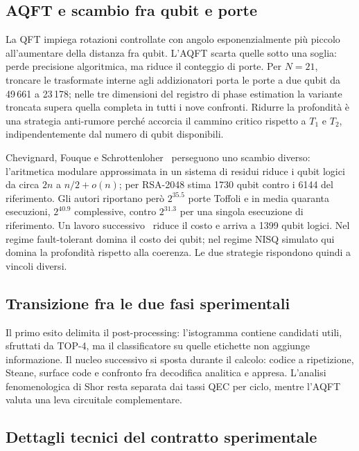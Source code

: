 \subsection{AQFT e scambio fra qubit e porte}
\label{app:aqft_estesa}

La \ac{QFT} impiega rotazioni controllate con angolo esponenzialmente più
piccolo all'aumentare della distanza fra qubit. L'\ac{AQFT} scarta quelle sotto
una soglia: perde precisione algoritmica, ma riduce il conteggio di porte. Per
$N=21$, troncare le trasformate interne agli addizionatori porta le porte a due
qubit da 49\,661 a 23\,178; nelle tre dimensioni del registro di phase
estimation la variante troncata supera quella completa in tutti i nove
confronti. Ridurre la profondità è una strategia anti-rumore perché accorcia il
cammino critico rispetto a $T_1$ e $T_2$, indipendentemente dal numero di qubit
disponibili.

Chevignard, Fouque e Schrottenloher~\cite{chevignard2025} perseguono uno scambio
diverso: l'aritmetica modulare approssimata in un sistema di residui riduce i
qubit logici da circa $2n$ a $n/2+o(n)$; per RSA-2048 stima 1730 qubit contro i
6144 del riferimento. Gli autori riportano però $2^{35.5}$ porte Toffoli e in
media quaranta esecuzioni, $2^{40.9}$ complessive, contro $2^{31.3}$ per una
singola esecuzione di riferimento. Un lavoro successivo~\cite{gidney2025}
riduce il costo e arriva a 1399 qubit logici. Nel regime fault-tolerant domina
il costo dei qubit; nel regime NISQ simulato qui domina la profondità rispetto
alla coerenza. Le due strategie rispondono quindi a vincoli diversi.

\subsection{Transizione fra le due fasi sperimentali}

Il primo esito delimita il post-processing: l'istogramma contiene candidati
utili, sfruttati da TOP-4, ma il classificatore su quelle etichette non aggiunge
informazione. Il nucleo successivo si sposta durante il calcolo: codice a
ripetizione, Steane, surface code e confronto fra decodifica analitica e
appresa. L'analisi fenomenologica di Shor resta separata dai tassi QEC per
ciclo, mentre l'\ac{AQFT} valuta una leva circuitale complementare.

\subsection{Dettagli tecnici del contratto sperimentale}
\label{app:contratto_metodo_esteso}

